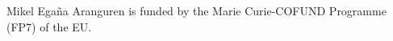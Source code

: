 \documentclass[sw]{iosart2c}
\begin{document}
Mikel Ega\~na Aranguren is funded by the Marie Curie-COFUND Programme (FP7) of the EU.











  
\end{document}
